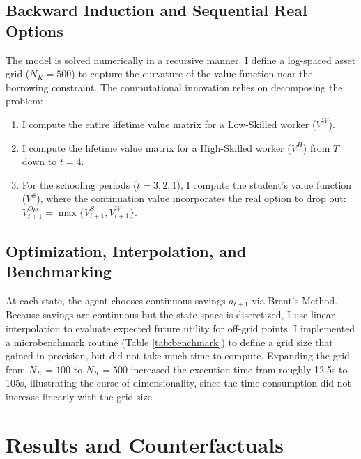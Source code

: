 \documentclass[11pt]{article}
\numberwithin{equation}{section}
\numberwithin{figure}{section}
\begin{document}
\subsection{Backward Induction and Sequential Real Options}
The model is solved numerically in a recursive manner. I define a log-spaced asset grid ($N_K=500$) to capture the curvature of the value function near the borrowing constraint. The computational innovation relies on decomposing the problem:
\begin{enumerate}
    \item I compute the entire lifetime value matrix for a Low-Skilled worker ($V^W$).
    \item I compute the lifetime value matrix for a High-Skilled worker ($V^H$) from $T$ down to $t=4$.
    \item For the schooling periods ($t=3, 2, 1$), I compute the student's value function ($V^S$), where the continuation value incorporates the real option to drop out: $V^{Opt}_{t+1} = \max\{V^S_{t+1}, V^W_{t+1}\}$.
\end{enumerate}

\subsection{Optimization, Interpolation, and Benchmarking}
At each state, the agent chooses continuous savings $a_{t+1}$ via Brent's Method. Because savings are continuous but the state space is discretized, I use linear interpolation to evaluate expected future utility for off-grid points. I implemented a microbenchmark routine (Table \ref{tab:benchmark}) to define a grid size that gained in precision, but did not take much time to compute. Expanding the grid from $N_K=100$ to $N_K=500$ increased the execution time from roughly 12.5s to 105s, illustrating the curse of dimensionality, since the time consumption did not increase linearly with the grid size.

\begin{table}[H] 
    \centering 
    \caption{Computational Performance: Execution Time by Asset Grid Size} 
    \label{tab:benchmark} 
    \resizebox{0.35\textwidth}{!}{%
    
    }
\end{table} 

\vspace{-1cm}

\section{Results and Counterfactuals}
\end{document}
